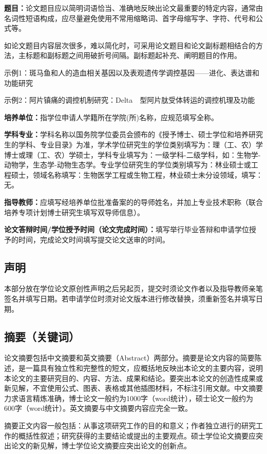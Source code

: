 \textbf{题目：}论文题目应以简明词语恰当、准确地反映出论文最重要的特定内容，通常由名词性短语构成，应尽量避免使用不常用缩略词、首字母缩写字、字符、代号和公式等。

如论文题目内容层次很多，难以简化时，可采用论文题目和论文副标题相结合的方法，主标题和副标题之间用破折号间隔。副标题起补充、阐明题目的作用。

示例1：斑马鱼和人的造血相关基因以及表观遗传学调控基因——进化、表达谱和功能研究

示例2：阿片镇痛的调控机制研究：Delta　型阿片肽受体转运的调控机理及功能

\textbf{培养单位：}指学位申请人学籍所在学院(所)名称，应规范填写全称。

\textbf{学科专业：}学科名称以国务院学位委员会颁布的《授予博士、硕士学位和培养研究生的学科、专业目录》为准，学术学位研究生的学位类别填写为：理（工、农）学博士或理（工、农）学硕士，学科专业填写为：一级学科-二级学科，如：生物学-动物学，生态学-动物生态学。专业学位研究生的学位类别填写为：林业硕士或工程硕士，领域名称填写：生物医学工程或生物工程，林业硕士未分设领域，填写：无。

\textbf{指导教师：}应填写经培养单位批准备案的的导师姓名，并加上专业技术职称（联合培养专项计划博士研究生填写双导师信息）。

\textbf{论文答辩时间/学位授予时间（论文完成时间）：}填写举行毕业答辩和申请学位授予的时间，完成论文时间填写提交论文送审的时间。

\subsection{声明}
本部分放在学位论文原创性声明之后另起页，提交时须论文作者以及指导教师亲笔签名并填写日期。若申请学位时须对论文版本进行修改替换，须重新签名并填写日期。
\subsection{摘要（关键词）}
论文摘要包括中文摘要和英文摘要（Abstract）两部分。摘要是论文内容的简要陈述，是一篇具有独立性和完整性的短文，应概括地反映出本论文的主要内容，说明本论文的主要研究目的、内容、方法、成果和结论。要突出本论文的创造性成果或新见解，不宜使用公式、图表、表格或其他插图材料，不标注引用文献。中文摘要力求语言精炼准确，博士论文一般约为1000字（word统计），硕士论文一般约为600字（word统计）。英文摘要与中文摘要内容应完全一致。

摘要正文内容一般包括：从事这项研究工作的目的和意义；作者独立进行的研究工作的概括性叙述；研究获得的主要结论或提出的主要观点。硕士学位论文摘要应突出论文的新见解，博士学位论文摘要应突出论文的创新点。

